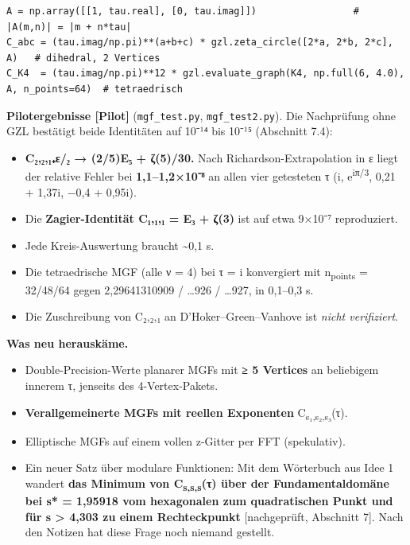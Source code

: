 \begin{verbatim}
A = np.array([[1, tau.real], [0, tau.imag]])                 # |A(m,n)| = |m + n*tau|
C_abc = (tau.imag/np.pi)**(a+b+c) * gzl.zeta_circle([2*a, 2*b, 2*c], A)   # dihedral, 2 Vertices
C_K4  = (tau.imag/np.pi)**12 * gzl.evaluate_graph(K4, np.full(6, 4.0), A, n_points=64)  # tetraedrisch
\end{verbatim}

\textbf{Pilotergebnisse {[}Pilot{]}} (\texttt{mgf\_test.py}, \texttt{mgf\_test2.py}). Die Nachprüfung ohne GZL bestätigt beide Identitäten auf 10⁻¹⁴ bis 10⁻¹⁵ (Abschnitt 7.4):

\begin{itemize}
\tightlist
\item
  \textbf{C₂,₂,₁₊ε/₂ → (2/5)E₅ + ζ(5)/30.} Nach Richardson-Extrapolation in ε liegt der relative Fehler bei \textbf{1,1--1,2×10⁻⁸} an allen vier getesteten τ (i, e\textsuperscript{iπ/3}, 0,21 + 1,37i, −0,4 + 0,95i).
\item
  Die \textbf{Zagier-Identität C₁,₁,₁ = E₃ + ζ(3)} ist auf etwa 9×10⁻⁷ reproduziert.
\item
  Jede Kreis-Auswertung braucht \textasciitilde0,1 s.
\item
  Die tetraedrische MGF (alle ν = 4) bei τ = i konvergiert mit n\textsubscript{points} = 32/48/64 gegen 2,29641310909 / \ldots926 / \ldots927, in 0,1--0,3 s.
\item
  Die Zuschreibung von C₂,₂,₁ an D'Hoker--Green--Vanhove ist \emph{nicht verifiziert}.
\end{itemize}

\textbf{Was neu herauskäme.}

\begin{itemize}
\tightlist
\item
  Double-Precision-Werte planarer MGFs mit \textbf{≥ 5 Vertices} an beliebigem innerem τ, jenseits des 4-Vertex-Pakets.
\item
  \textbf{Verallgemeinerte MGFs mit reellen Exponenten} C\textsubscript{s₁,s₂,s₃}(τ).
\item
  Elliptische MGFs auf einem vollen z-Gitter per FFT (spekulativ).
\item
  Ein neuer Satz über modulare Funktionen: Mit dem Wörterbuch aus Idee 1 wandert \textbf{das Minimum von C\textsubscript{s,s,s}(τ) über der Fundamentaldomäne bei s* = 1,95918 vom hexagonalen zum quadratischen Punkt und für s \textgreater{} 4,303 zu einem Rechteckpunkt} {[}nachgeprüft, Abschnitt 7{]}. Nach den Notizen hat diese Frage noch niemand gestellt.
\end{itemize}

